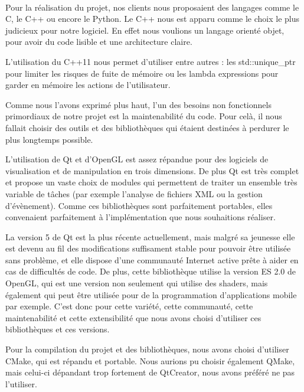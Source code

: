 \paragraph{}
        Pour la réalisation du projet, nos clients nous proposaient des langages comme le C, le C++ ou encore le Python. Le C++ nous est apparu comme le choix le plus judicieux pour notre logiciel. En effet nous voulions un langage orienté objet, pour avoir du code lisible et une architecture claire.
        
	L'utilisation du C++11 nous permet d'utiliser entre autres : les std::unique\_ptr pour limiter les risques de fuite de mémoire ou les lambda expressions pour garder en mémoire les actions de l'utilisateur.

    Comme nous l'avons exprimé plus haut, l'un des besoins non fonctionnels primordiaux de notre projet est la maintenabilité du code. Pour celà, il nous fallait choisir des outils et des bibliothèques qui étaient destinées à perdurer le plus longtemps possible.
    
    L'utilisation de Qt et d'OpenGL est assez répandue pour des logiciels de visualisation et de manipulation en trois dimensions. De plus Qt est très complet et propose un vaste choix de modules qui permettent de traiter un ensemble très variable de tâches (par exemple l'analyse de fichiers XML ou la gestion d'évènement). Comme ces bibliothèques sont parfaitement portables, elles convenaient parfaitement à l'implémentation que nous souhaitions réaliser.
    
    La version 5 de Qt est la plus récente actuellement, mais malgré sa jeunesse elle est devenu au fil des modifications suffisament stable pour pouvoir être utilisée sans problème, et elle dispose d'une communauté Internet active prête à aider en cas de difficultés de code. De plus, cette bibliothèque utilise la version ES 2.0 de OpenGL, qui est une version non seulement qui utilise des shaders, mais également qui peut être utilisée pour de la programmation d'applications mobile par exemple. C'est donc pour cette variété, cette communauté, cette maintenabilité et cette extensibilité que nous avons choisi d'utiliser ces bibliothèques et ces versions.

    Pour la compilation du projet et des bibliothèques, nous avons choisi d'utiliser CMake, qui est répandu et portable. Nous aurions pu choisir également QMake, mais celui-ci dépandant trop fortement de QtCreator, nous avons préféré ne pas l'utiliser.
